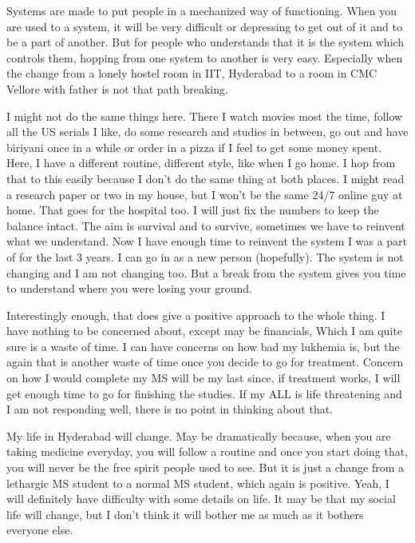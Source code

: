 Systems are made to put people in a mechanized way of functioning. When you are used to a system,
it will be very difficult or depressing to get out of it and to be a part of another. But for people
who understands that it is the system which controls them, hopping from one system to another is very
easy. Especially when the change from a lonely hostel room in IIT, Hyderabad to a room in CMC 
Vellore with father is not that path breaking. 

I might not do the same things here. There I watch movies most the time, follow all the US serials
I like, do some research and studies in between, go out and have biriyani once in a while or order
in a pizza if I feel to get some money spent. Here, I have a different routine, different style, like 
when I go home. I hop from that to this easily because I don't do the same thing at both places.
I might read a research paper or two in my house, but I won't be the same 24/7 online guy at home.
That goes for the hospital too. I will just fix the numbers to keep the balance intact. The aim 
is survival and to survive, sometimes we have to reinvent what we understand. Now I have enough
time to reinvent the system I was a part of for the last 3 years. I can go in as a new person 
(hopefully). The system is not changing and I am not changing too. But a break from the system gives you time 
to understand where you were losing your ground.

Interestingly enough, that does give a positive approach to the whole thing. I have nothing to be 
concerned about, except may be financials, Which I am quite sure is a waste of time. I can have 
concerns on how bad my lukhemia is, but the again that is another waste of time once you decide
to go for treatment. Concern on how I would complete my MS will be my last since, if treatment
works, I will get enough time to go for finishing the studies. If my ALL is life threatening
and I am not responding well, there is no point in thinking about that.

My life in Hyderabad will change. May be dramatically because, when you are taking medicine 
everyday, you will follow a routine and once you start doing that, you will never be the free
spirit people used to see. But it is just a change from a lethargic MS student to a normal 
MS student, which again is positive. Yeah, I will definitely have difficulty with some details 
on life. It may be that my social life will change, but I don't think it will bother me as much 
as it bothers everyone else.


